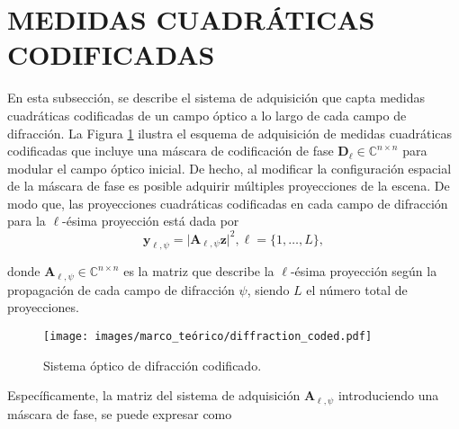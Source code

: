 

\section{MEDIDAS CUADRÁTICAS CODIFICADAS}
En esta subsección, se describe el sistema de adquisición que capta medidas cuadráticas codificadas de un campo óptico a lo largo de cada campo de difracción. La Figura \ref{fig:coded_difraction_systems} ilustra el esquema de adquisición de medidas cuadráticas codificadas que incluye una máscara de codificación de fase $\mathbf{D}_\ell \in \mathbb{C}^{n\times n}$ para modular el campo óptico inicial. De hecho, al modificar la configuración espacial de la máscara de fase es posible adquirir múltiples proyecciones de la escena. De modo que, las proyecciones cuadráticas codificadas en cada campo de difracción para la $\ell$-ésima proyección está dada por 
\begin{equation}
    \mathbf{y}_{\ell, \psi} = \vert \mathbf{A}_{\ell, \psi}\mathbf{z} \vert^2, \ell=\{1,\dots,L\},
    \label{eq:phase_retrieval_problem}
\end{equation}

donde $\mathbf{A}_{\ell, \psi}\in\mathbb{C}^{n\times n}$ es la matriz que describe la $\ell$-ésima proyección según la propagación de cada campo de difracción $\psi$, siendo $L$ el número total de proyecciones. 
\begin{figure}[!h]
    \centering
    \caption{\hspace{2mm}Sistema óptico de difracción codificado.}
    \texttt{[image: images/marco\_teórico/diffraction\_coded.pdf]}
    \label{fig:coded_difraction_systems}
\end{figure}

Específicamente, la matriz del sistema de adquisición $\mathbf{A}_{\ell, \psi}$ introduciendo una máscara de fase, se puede expresar como

